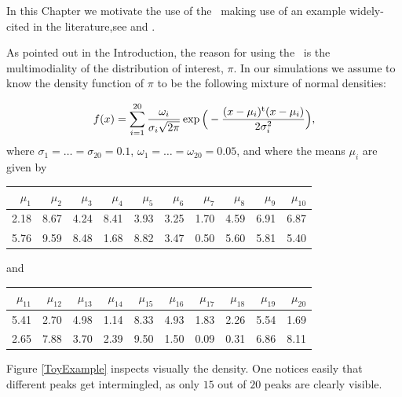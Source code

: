 In this Chapter we motivate the use of the \PT\, making use of an example widely-cited in the literature,see \cite{BaragattiParallelTemperingWithEquiEnergyMoves} and \citet*{FamingLiang}. 

As pointed out in the Introduction, the reason for using the \PT\, is the multimodiality of the distribution of interest, $\pi$. In our simulations we assume to know the density function of $\pi$ to be the following mixture of normal densities:

\begin{equation}\label{experimental pi}
f(x) = 
\sum_{i=1}^{20} \frac{\omega_i}{ \sigma_i \sqrt{2 \pi} } \exp \Big( -\frac{(x - \mu_i)^{\mathrm{t}} (x - \mu_i)}{2 \sigma_i^2} \Big),	
\end{equation}
where $\sigma_1 = \dots = \sigma_{20} = 0.1$, $\omega_1 = \dots = \omega_{20} = 0.05 $, and where  the means $\mu_i$ are given by

\begin{table}[ht]
	\centering
\begin{tabular}{rrrrrrrrrr}
  \hline
$\mu_1$ & $\mu_2$ & $\mu_3$ & $\mu_4$ & $\mu_5$ & $\mu_6$ & $\mu_7$ & $\mu_8$ & $\mu_9$ & $\mu_{10}$ \\ 
  \hline
2.18 & 8.67 & 4.24 & 8.41 & 3.93 & 3.25 & 1.70 & 4.59 & 6.91 & 6.87 \\ 
  5.76 & 9.59 & 8.48 & 1.68 & 8.82 & 3.47 & 0.50 & 5.60 & 5.81 & 5.40 \\ 
   \hline
\end{tabular}
\end{table}
and 

\begin{table}[ht]
	\centering
\begin{tabular}{rrrrrrrrrr}
  \hline
$\mu_{11}$ & $\mu_{12}$ & $\mu_{13}$ & $\mu_{14}$ & $\mu_{15}$ & $\mu_{16}$ & $\mu_{17}$ & $\mu_{18}$ & $\mu_{19}$ & $\mu_{20}$ \\ 
  \hline
5.41 & 2.70 & 4.98 & 1.14 & 8.33 & 4.93 & 1.83 & 2.26 & 5.54 & 1.69 \\ 
  2.65 & 7.88 & 3.70 & 2.39 & 9.50 & 1.50 & 0.09 & 0.31 & 6.86 & 8.11 \\ 
   \hline
\end{tabular}
\end{table}
 
Figure \ref{ToyExample} inspects visually the density. One notices easily that different peaks get intermingled, as only $15$ out of $20$ peaks are clearly visible.  

